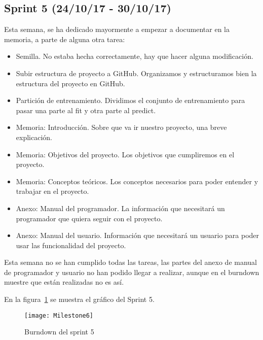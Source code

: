 \subsection{Sprint 5 (24/10/17 - 30/10/17)}
Esta semana, se ha dedicado mayormente a empezar a documentar en la memoria, a parte de alguna otra tarea:
\begin{itemize}
\item Semilla. No estaba hecha correctamente, hay que hacer alguna modificación.
\item Subir estructura de proyecto a GitHub. Organizamos y estructuramos bien la estructura del proyecto en GitHub.
\item Partición de entrenamiento. Dividimos el conjunto de entrenamiento para pasar una parte al fit y otra parte al predict.
\item Memoria: Introducción. Sobre que va ir nuestro proyecto, una breve explicación.
\item Memoria: Objetivos del proyecto. Los objetivos que cumpliremos en el proyecto.
\item Memoria: Conceptos teóricos. Los conceptos necesarios para poder entender y trabajar en el proyecto.
\item Anexo: Manual del programador. La información que necesitará un programador que quiera seguir con el proyecto.
\item Anexo: Manual del usuario. Información que necesitará un usuario para poder usar las funcionalidad del proyecto.
\end{itemize}

Esta semana no se han cumplido todas las tareas, las partes del anexo de manual de programador y usuario no han podido llegar a realizar, aunque en el burndown muestre que están realizadas no es así.

En la figura~\ref{fig:Milestone6} se muestra el gráfico del Sprint 5.

\begin{figure}
\centering
\texttt{[image: Milestone6]}
\caption{Burndown del sprint 5}
\label{fig:Milestone6}
\end{figure}

